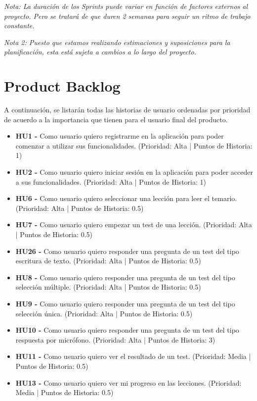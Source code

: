 \textit{Nota: La duración de los Sprints puede variar en función de factores externos al proyecto. Pero se tratará de que duren 2 semanas para seguir un ritmo de trabajo constante.}

\textit{Nota 2: Puesto que estamos realizando estimaciones y suposiciones para la planificación, esta está sujeta a cambios a lo largo del proyecto.}
\section{Product Backlog}
A continuación, se listarán todas las historias de usuario ordenadas por prioridad de acuerdo a la importancia que tienen para el usuario final del producto.
\begin{itemize}
    \item \textbf{HU1 - } Como usuario quiero registrarme en la aplicación para poder comenzar a utilizar sus funcionalidades. (Prioridad: Alta | Puntos de Historia: 1)
    \item \textbf{HU2 - } Como usuario quiero iniciar sesión en la aplicación para poder acceder a sus funcionalidades. (Prioridad: Alta | Puntos de Historia: 1)
    \item \textbf{HU6 - } Como usuario quiero seleccionar una lección para leer el temario. (Prioridad: Alta | Puntos de Historia: 0.5)
    \item \textbf{HU7 - } Como usuario quiero empezar un test de una lección. (Prioridad: Alta | Puntos de Historia: 0.5)
    \item \textbf{HU26 - } Como usuario quiero responder una pregunta de un test del tipo escritura de texto. (Prioridad: Alta | Puntos de Historia: 0.5)
    \item \textbf{HU8 - } Como usuario quiero responder una pregunta de un test del tipo selección múltiple. (Prioridad: Alta | Puntos de Historia: 0.5)
    \item \textbf{HU9 - } Como usuario quiero responder una pregunta de un test del tipo selección única. (Prioridad: Alta | Puntos de Historia: 0.5)
    \item \textbf{HU10 - } Como usuario quiero responder una pregunta de un test del tipo respuesta por micrófono. (Prioridad: Alta | Puntos de Historia: 3)
    \item \textbf{HU11 - } Como usuario quiero ver el resultado de un test. (Prioridad: Media | Puntos de Historia: 0.5)
    \item \textbf{HU13 - } Como usuario quiero ver mi progreso en las lecciones. (Prioridad: Media | Puntos de Historia: 0.5)

\end{itemize}
